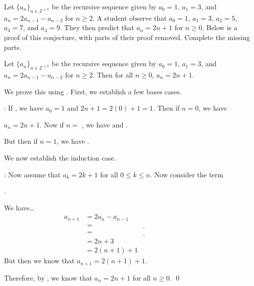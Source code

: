 \documentclass[11pt,letterpaper]{article}
\begin{document}
 Let $\{ a_n \}_{n \in \mathbb{Z}^{\geq 0}}$ be the recursive sequence given by $a_0= 1$, $a_1= 3$, and $a_n= 2a_{n - 1}  - a_{n - 2}$ for $n \geq 2$. A student observe that $a_0= 1$, $a_1= 3$, $a_2= 5$, $a_3= 7$, and $a_4= 9$. They then predict that $a_n= 2n + 1$ for $n \geq 0$. Below is a proof of this conjecture, with parts of their proof removed. Complete the missing parts. \pspace

 Let $\{ a_n \}_{n \in \mathbb{Z}^{\geq 0}}$ be the recursive sequence given by $a_0= 1$, $a_1= 3$, and $a_n= 2a_{n - 1}  - a_{n - 2}$ for $n \geq 2$. Then for all $n \geq 0$, $a_n= 2n + 1$. \pspace

 We prove this using \underline{\hspace{6cm}}. First, we establish a few bases cases. \pspace

: If \underline{\hspace{3cm}}, we have $a_0= 1$ and $2n + 1= 2(0) + 1= 1$. Then if $n= 0$, we have \pspace

$a_n= 2n + 1$. Now if $n=$ \underline{\hspace{3cm}}, we have \underline{\hspace{4cm}} and \underline{\hspace{4cm}}. \pspace

But then if $n= 1$, we have \underline{\hspace{3cm}}. \pspace

We now establish the induction case. \pspace

: Now assume that $a_k= 2k + 1$ for all $0 \leq k \leq n$. Now consider the term \pspace

\underline{\hspace{3cm}}. \pspace

We have\dots
	\[
	\begin{aligned}
	a_{n + 1}&= 2a_n - a_{n - 1} \\[0.3cm]
	&= \underline{\hspace{6cm}} \\[0.3cm]
	&= \underline{\hspace{6cm}} \\[0.3cm]
	&= 2n + 3 \\[0.3cm]
	&= 2(n + 1) + 1
	\end{aligned}
	\] \pspace
But then we know that $a_{n + 1}= 2(n + 1) + 1$. \pspace

Therefore, by \underline{\hspace{6cm}}, we know that $a_n= 2n + 1$ for all $n \geq 0$. \qed
\end{document}
